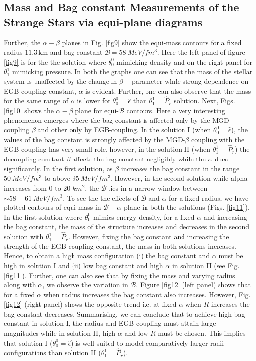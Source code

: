 \documentclass[]{aastex631}
\begin{document}
\subsection{Mass and Bag constant Measurements of the Strange Stars via equi-plane diagrams} \label{sec5.4}
Further, the $\alpha-\beta$ planes in Fig. \ref{fig9} show the equi-mass contours for a fixed radius $11.3 ~ \text{km}$ and bag constant $\mathcal{B}=58~ MeV/fm^3$. Here the left panel of figure \ref{fig9} is for the the solution where $\theta_0^0$ mimicking density and on the right panel for $\theta_1^1$ mimicking pressure. In both the graphs one can see that the mass of the stellar system is unaffected by the change in $\beta-$parameter while strong dependence on EGB coupling constant, $\alpha$ is evident. Further, one can also observe that the mass for the same range of $\alpha$ is lower for $\theta_0^0=\hat{\epsilon}$ than $\theta_1^1=\hat{P}_r$ solution. Next, Figs. \ref{fig10} shows the $\alpha-\beta$ plane for equi-$\mathcal{B}$ contours. Here a very interesting phenomenon emerges where the bag constant is affected only by the MGD coupling $\beta$ and other only by EGB-coupling. In the solution I (when $\theta_0^0=\hat{\epsilon}$), the values of the bag constant is strongly affected by the MGD-$\beta$ coupling with the EGB coupling has very small role, however, in the solution II (when $\theta_1^1=\hat{P}_r$) the decoupling constant $\beta$ affects the bag constant negligibly while the $\alpha$ does significantly. In the first solution, as $\beta$ increases the bag constant in the range $50 ~MeV/fm^3$ to above $95~MeV/fm^3$. However, in the second solution while alpha increases from 0 to 20 $km^2$, the $\mathcal{B}$ lies in a narrow window between $\sim 58-61~MeV/fm^3$. To see the the effects of $\mathcal{B}$ and $\alpha$ for a fixed radius,  we have plotted contours of equi-mass in $\mathcal{B}-\alpha$ plane in both the solutions (Figs. \ref{fig11}). In the first solution where $\theta_0^0$ mimics energy density, for a fixed $\alpha$ and increasing the bag constant, the mass of the structure increases and decreases in the second solution with $\theta_1^1=\hat{P}_r$. However, fixing the bag constant and increasing the strength of the EGB coupling constant, the mass in both solutions increases. Hence, to obtain a high mass configuration (i) the bag constant and $\alpha$ must be high in solution I and (ii) low bag constant and high $\alpha$ in solution II (see Fig. \ref{fig11}). Further, one can also see that by fixing the mass and varying radius along with $\alpha$, we observe the variation in $\mathcal{B}$. Figure \ref{fig12} (left panel) shows that for a fixed $\alpha$ when radius increases the bag constant also increases. However, Fig. \ref{fig12} (right panel) shows the opposite trend i.e. at fixed $\alpha$ when $R$ increases the bag constant decreases. Summarising, we can conclude that to achieve high bag constant in solution I, the radius and EGB coupling must attain large magnitudes while in solution II, high $\alpha$ and low $R$ must be chosen. This implies that solution I ($\theta_0^0=\hat{\epsilon}$) is well suited to model comparatively larger radii configurations than solution II ($\theta_1^1=\hat{P}_r$). 
\end{document}
